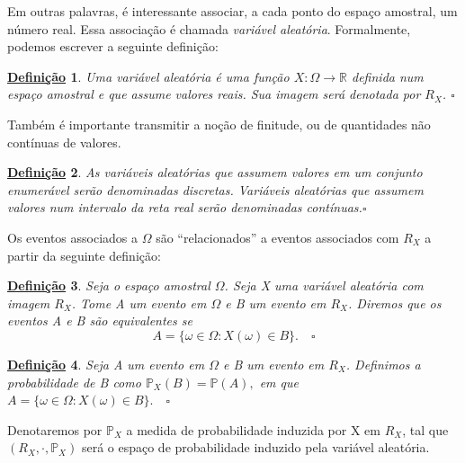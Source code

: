 \documentclass{article}
\newtheorem*{def*}{\underline{Defini\c c\~ao}}
\begin{document}
Em outras palavras, é interessante associar, a cada ponto do espaço amostral, um número real. Essa associação é
chamada \textit{variável aleatória}. Formalmente, podemos escrever a seguinte definição:
\begin{def*}
  Uma variável aleatória é uma função \(X:\Omega \rightarrow \mathbb{R}\) definida num espaço amostral e que assume valores reais.
  Sua imagem será denotada por \(R_{X}\). \(\square\)
\end{def*}
Também é importante transmitir a noção de finitude, ou de quantidades não contínuas de valores.
\begin{def*}
  As variáveis aleatórias que assumem valores em um conjunto enumerável serão denominadas discretas. Variáveis aleatórias que assumem valores
  num intervalo da reta real serão denominadas contínuas.\(\square\)
\end{def*}
Os eventos associados a \(\Omega \) são ``relacionados'' a eventos associados com \(R_{X}\) a partir 
da seguinte definição:
\begin{def*}
  Seja o espaço amostral \(\Omega \). Seja X uma variável aleatória com imagem \(R_{X}\). Tome A
  um evento em \(\Omega \) e B um evento em \(R_{X}\). Diremos que os eventos A e B são equivalentes se 
  \[
    A = \{\omega \in \Omega : X(\omega )\in B\}.\quad\square
  \]
\end{def*}
\begin{def*}
  Seja A um evento em \(\Omega \) e B um evento em \(R_{X}\). Definimos a probabilidade de B como
  \(\mathbb{P}_{X}(B) = \mathbb{P}(A),\) em que \(A = \{\omega \in \Omega : X(\omega )\in B\}.\quad\square\)
\end{def*}
Denotaremos por \(\mathbb{P}_{X}\) a medida de probabilidade induzida por X em \(R_{X}\), tal que \((R_{X}, \cdot , \mathbb{P}_{X})\) será o espaço
de probabilidade induzido pela variável aleatória.
\end{document}
